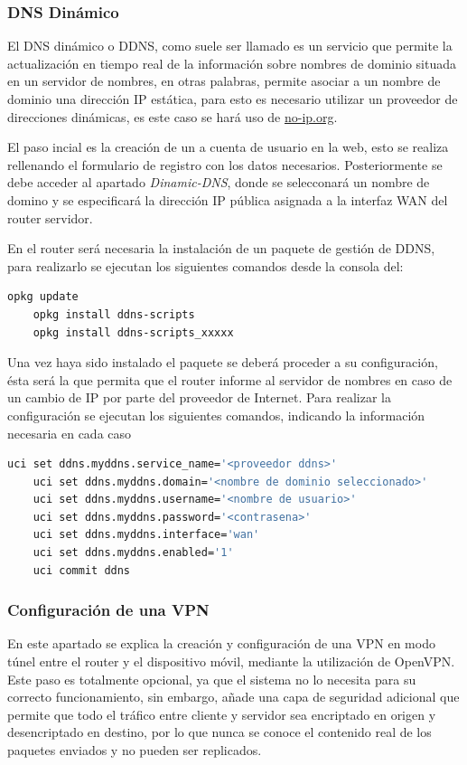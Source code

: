 \documentclass[12pt, twoside]{article}
\begin{document}
        \subsubsection{DNS Dinámico}
            El DNS dinámico o DDNS, como suele ser llamado es un servicio que permite la actualización en tiempo real de la información sobre nombres de dominio situada en un servidor de nombres, en otras palabras, permite asociar a un nombre de dominio una dirección IP estática, para esto es necesario utilizar un proveedor de direcciones dinámicas, es este caso se hará uso de \url{no-ip.org}.

            El paso incial es la creación de un a cuenta de usuario en la web, esto se realiza rellenando el formulario de registro con los datos necesarios. Posteriormente se debe acceder al apartado \textit{Dinamic-DNS}, donde se selecconará un nombre de domino y se especificará la dirección IP pública asignada a la interfaz WAN del router servidor.

            En el router será necesaria la instalación de un paquete de gestión de DDNS, para realizarlo se ejecutan los siguientes comandos desde la consola del:

            \begin{lstlisting}[language=bash]
    opkg update
    opkg install ddns-scripts
    opkg install ddns-scripts_xxxxx
            \end{lstlisting}

            Una vez haya sido instalado el paquete se deberá proceder a su configuración, ésta será la que permita que el router informe al servidor de nombres en caso de un cambio de IP por parte del proveedor de Internet. Para realizar la configuración se ejecutan los siguientes comandos, indicando la información necesaria en cada caso
            
            \begin{lstlisting}[language=bash]
    uci set ddns.myddns.service_name='<proveedor ddns>'
    uci set ddns.myddns.domain='<nombre de dominio seleccionado>'
    uci set ddns.myddns.username='<nombre de usuario>'
    uci set ddns.myddns.password='<contrasena>'
    uci set ddns.myddns.interface='wan'
    uci set ddns.myddns.enabled='1'
    uci commit ddns	
            \end{lstlisting}

        \subsubsection{Configuración de una VPN}
            En este apartado se explica la creación y configuración de una VPN en modo túnel entre el router y el dispositivo móvil, mediante la utilización de OpenVPN. Este paso es totalmente opcional, ya que el sistema no lo necesita para su correcto funcionamiento, sin embargo, añade una capa de seguridad adicional que permite que todo el tráfico entre cliente y servidor sea encriptado en origen y desencriptado en destino, por lo que nunca se conoce el contenido real de los paquetes enviados y no pueden ser replicados.
\end{document}
